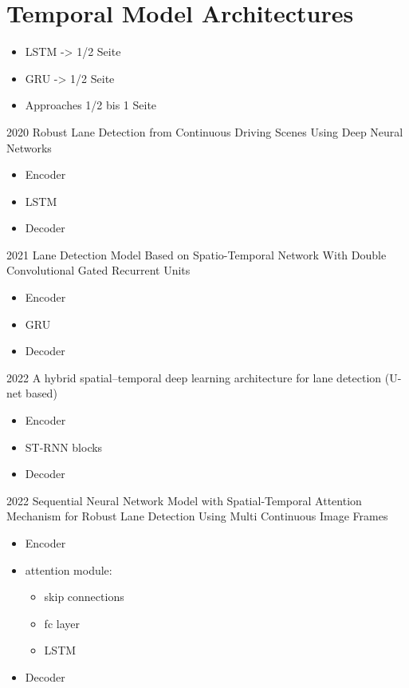 \section{Temporal Model Architectures}
\label{sec:temporalModelArchitecture}

\begin{itemize}
    \item LSTM -> 1/2 Seite
    \item GRU -> 1/2 Seite
    \item Approaches 1/2 bis 1 Seite
\end{itemize}

2020 Robust Lane Detection from Continuous Driving Scenes Using Deep Neural Networks
\begin{itemize}
    \item Encoder
    \item LSTM
    \item Decoder
\end{itemize}

2021 Lane Detection Model Based on Spatio-Temporal Network With Double Convolutional Gated Recurrent Units
\begin{itemize}
    \item Encoder
    \item GRU
    \item Decoder
\end{itemize}

2022 A hybrid spatial–temporal deep learning architecture for lane detection (U-net based)
\begin{itemize}
    \item Encoder
    \item ST-RNN blocks
    \item Decoder
\end{itemize}

2022 Sequential Neural Network Model with Spatial-Temporal Attention Mechanism for Robust Lane Detection Using Multi Continuous Image Frames
\begin{itemize}
    \item Encoder
    \item attention module:
    \begin{itemize}
        \item skip connections
        \item fc layer
        \item LSTM
    \end{itemize}
    \item Decoder
\end{itemize}

